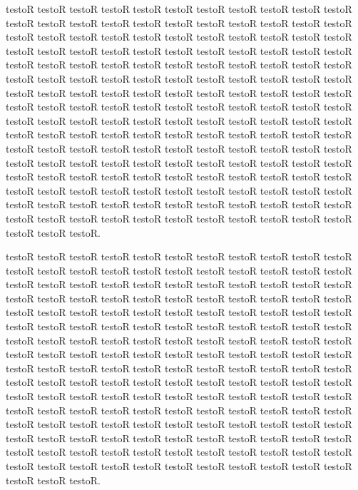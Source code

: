 \documentclass[11pt,a4paper]{book}
\begin{document}
\begin{pages}
\begin{Rightside}
\pstart testoR testoR testoR testoR testoR testoR testoR testoR testoR testoR testoR testoR testoR testoR testoR testoR testoR testoR testoR testoR testoR testoR testoR testoR testoR testoR testoR testoR testoR testoR testoR testoR testoR testoR testoR testoR testoR testoR testoR testoR testoR testoR testoR testoR testoR testoR testoR testoR testoR testoR testoR testoR testoR testoR testoR testoR testoR testoR testoR testoR testoR testoR testoR testoR testoR testoR testoR testoR testoR testoR testoR testoR testoR testoR testoR testoR testoR testoR testoR testoR testoR testoR testoR testoR testoR testoR testoR testoR testoR testoR testoR testoR testoR testoR testoR testoR testoR testoR testoR testoR testoR testoR testoR testoR testoR testoR testoR testoR testoR testoR testoR testoR testoR testoR testoR testoR testoR testoR testoR testoR testoR testoR testoR testoR testoR testoR testoR testoR testoR testoR testoR testoR testoR testoR testoR testoR testoR testoR testoR testoR testoR testoR testoR testoR testoR testoR testoR testoR testoR testoR testoR testoR testoR testoR testoR testoR testoR testoR testoR testoR testoR testoR testoR testoR testoR testoR testoR testoR testoR testoR testoR testoR testoR testoR testoR testoR testoR testoR testoR.\pend

\pstart testoR testoR testoR testoR testoR testoR testoR testoR testoR testoR testoR testoR testoR testoR testoR testoR testoR testoR testoR testoR testoR testoR testoR testoR testoR testoR testoR testoR testoR testoR testoR testoR testoR testoR testoR testoR testoR testoR testoR testoR testoR testoR testoR testoR testoR testoR testoR testoR testoR testoR testoR testoR testoR testoR testoR testoR testoR testoR testoR testoR testoR testoR testoR testoR testoR testoR testoR testoR testoR testoR testoR testoR testoR testoR testoR testoR testoR testoR testoR testoR testoR testoR testoR testoR testoR testoR testoR testoR testoR testoR testoR testoR testoR testoR testoR testoR testoR testoR testoR testoR testoR testoR testoR testoR testoR testoR testoR testoR testoR testoR testoR testoR testoR testoR testoR testoR testoR testoR testoR testoR testoR testoR testoR testoR testoR testoR testoR testoR testoR testoR testoR testoR testoR testoR testoR testoR testoR testoR testoR testoR testoR testoR testoR testoR testoR testoR testoR testoR testoR testoR testoR testoR testoR testoR testoR testoR testoR testoR testoR testoR testoR testoR testoR testoR testoR testoR testoR testoR testoR testoR testoR testoR testoR testoR testoR testoR testoR testoR testoR.\pend


\end{Rightside}
\end{pages}
\end{document}
